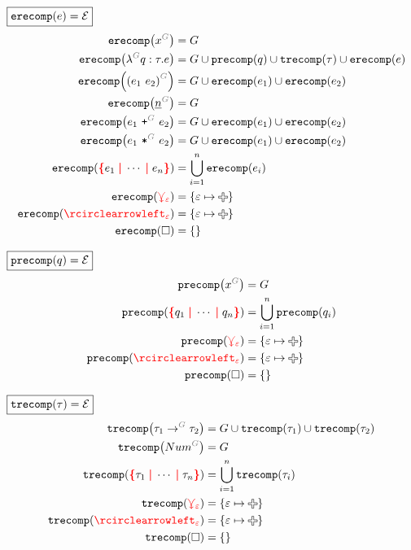 \noindent $\boxed{\operatorname{\texttt{erecomp}}\mathopen{}\left(e\right)\mathclose{} = \mathcal{E}}$
%
\begin{align*}
  \erecomp{\eVar{G}{x}} &= G
  \\
  \erecomp{\eFun{G}{q}{\tau}{e}}
    &= G \cup \precomp{q} \cup \trecomp{\tau} \cup \erecomp{e}
  \\
  \erecomp{\eApp{G}{e_1}{e_2}}
    &= G \cup \erecomp{e_1} \cup \erecomp{e_2}
  \\
  \erecomp{\eNum{G}{n}} &= G
  \\
  \erecomp{\ePlus{G}{e_1}{e_2}}
    &= G \cup \erecomp{e_1} \cup \erecomp{e_2}
  \\
  \erecomp{\eTimes{G}{e_1}{e_2}}
    &= G \cup \erecomp{e_1} \cup \erecomp{e_2}
  \\
  \erecomp{\conflictHole{e_1, \cdots, e_n}}
  &= \bigcup_{i=1}^n \erecomp{e_i}
  \\
  \erecomp{\multiVertex{\e}} &= \SetOf{\e \mapsto \Plus}
  \\
  \erecomp{\cycleVertex{\e}} &= \SetOf{\e \mapsto \Plus}
  \\
  \erecomp{\hole} &= \SetOf{}
\end{align*}

\noindent $\boxed{\operatorname{\texttt{precomp}}\mathopen{}\left(q\right)\mathclose{} = \mathcal{E}}$
%
\begin{align*}
  \precomp{\pVar{G}{x}} &= G
  \\
  \precomp{\conflictHole{q_1, \cdots, q_n}} &= \bigcup_{i=1}^n \precomp{q_i}
  \\
  \precomp{\multiVertex{\e}} &= \SetOf{\e \mapsto \Plus}
  \\
  \precomp{\cycleVertex{\e}} &= \SetOf{\e \mapsto \Plus}
  \\
  \precomp{\hole} &= \SetOf{}
\end{align*}

\noindent $\boxed{\operatorname{\texttt{trecomp}}\mathopen{}\left(\tau\right)\mathclose{} = \mathcal{E}}$
%
\begin{align*}
  \trecomp{\tArrow{G}{\tau_1}{\tau_2}}
    &= G \cup \trecomp{\tau_1} \cup \trecomp{\tau_2}
  \\
  \trecomp{\tNum{G}} &= G
  \\
  \trecomp{\conflictHole{\tau_1, \cdots, \tau_n}} &= \bigcup_{i=1}^n \trecomp{\tau_i}
  \\
  \trecomp{\multiVertex{\e}} &= \SetOf{\e \mapsto \Plus}
  \\
  \trecomp{\cycleVertex{\e}} &= \SetOf{\e \mapsto \Plus}
  \\
  \trecomp{\hole} &= \SetOf{}
\end{align*}


